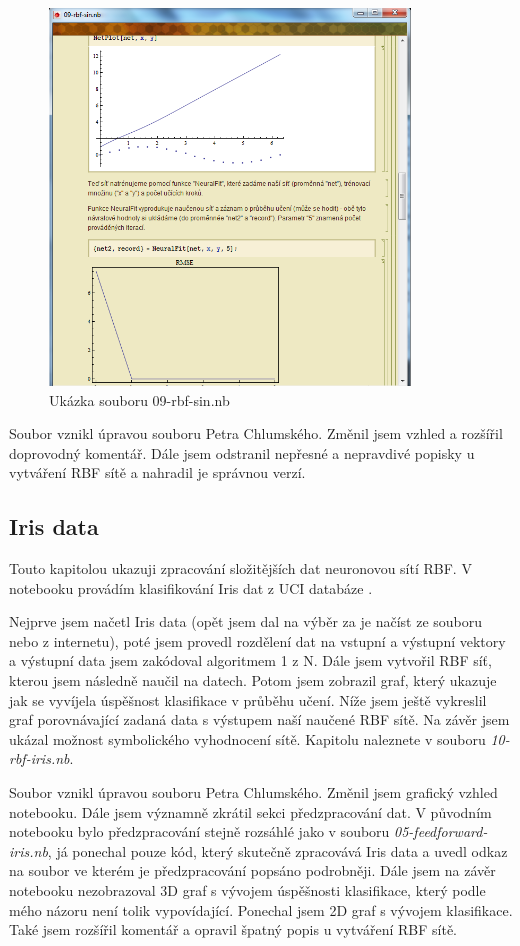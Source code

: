 \documentclass[11pt,twoside,a4paper]{book}
\begin{document}
\begin{figure}[h!]
\begin{center}
\includegraphics[height=10cm]{figures/ukazka09.png}
\caption{Ukázka souboru 09-rbf-sin.nb}
\label{fig:rbf-sin}
\end{center}
\end{figure}

Soubor vznikl úpravou souboru Petra Chlumského. Změnil jsem vzhled a rozšířil doprovodný komentář. Dále jsem odstranil nepřesné a nepravdivé popisky u vytváření RBF sítě a nahradil je správnou verzí.
\newpage
\subsection{Iris data}
Touto kapitolou ukazuji zpracování složitějších dat neuronovou sítí RBF. V notebooku provádím klasifikování Iris dat z UCI databáze \cite{UCI}.

Nejprve jsem načetl Iris data (opět jsem dal na výběr za je načíst ze souboru nebo z internetu), poté jsem provedl rozdělení dat na vstupní a výstupní vektory a výstupní data jsem zakódoval algoritmem 1 z N. Dále jsem vytvořil RBF síť, kterou jsem následně naučil na datech. Potom jsem zobrazil graf, který ukazuje jak se vyvíjela úspěšnost klasifikace v průběhu učení. Níže jsem ještě vykreslil graf porovnávající zadaná data s výstupem naší naučené RBF sítě. Na závěr jsem ukázal možnost symbolického vyhodnocení sítě. Kapitolu naleznete v souboru \textit{10-rbf-iris.nb}.

Soubor vznikl úpravou souboru Petra Chlumského. Změnil jsem grafický vzhled notebooku. Dále jsem významně zkrátil sekci předzpracování dat. V původním notebooku bylo předzpracování stejně rozsáhlé jako v souboru \textit{05-feedforward-iris.nb}, já ponechal pouze kód, který skutečně zpracovává Iris data a uvedl odkaz na soubor ve kterém je předzpracování popsáno podrobněji. Dále jsem na závěr notebooku nezobrazoval 3D graf s vývojem úspěšnosti klasifikace, který podle mého názoru není tolik vypovídající. Ponechal jsem 2D graf s vývojem klasifikace. Také jsem rozšířil komentář a opravil špatný popis u vytváření RBF sítě.
\end{document}

